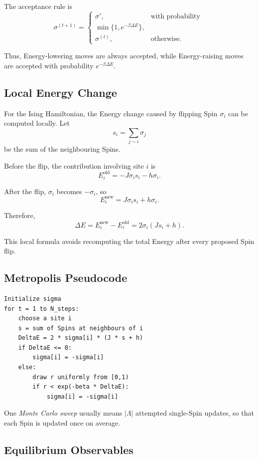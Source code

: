 \documentclass[a4paper, 10pt, onepage]{elegantbook}
\begin{document}
{The acceptance rule is
\[
\sigma^{(t+1)}
=
\begin{cases}
\sigma', & \text{with probability }  \\
\min\{1,e^{-\beta\Delta E}\}, \\
\sigma^{(t)}, & \text{otherwise}.
\end{cases}
\]

Thus, Energy-lowering moves are always accepted, while Energy-raising moves are
accepted with probability \(e^{-\beta\Delta E}\).

\subsection{Local Energy Change}

For the Ising Hamiltonian, the Energy change caused by flipping Spin
\(\sigma_i\) can be computed locally. Let
\[
s_i=\sum_{j\sim i}\sigma_j
\]
be the sum of the neighbouring Spins.

Before the flip, the contribution involving site \(i\) is
\[
E_i^{\mathrm{old}}
=
-J\sigma_i s_i-h\sigma_i.
\]

After the flip, \(\sigma_i\) becomes \(-\sigma_i\), so
\[
E_i^{\mathrm{new}}
=
J\sigma_i s_i+h\sigma_i.
\]

Therefore,
\[
\Delta E
=
E_i^{\mathrm{new}}-E_i^{\mathrm{old}}
=
2\sigma_i(Js_i+h).
\]

This local formula avoids recomputing the total Energy after every proposed
Spin flip.

\subsection{Metropolis Pseudocode}

\begin{verbatim}
Initialize sigma
for t = 1 to N_steps:
    choose a site i
    s = sum of Spins at neighbours of i
    DeltaE = 2 * sigma[i] * (J * s + h)
    if DeltaE <= 0:
        sigma[i] = -sigma[i]
    else:
        draw r uniformly from [0,1)
        if r < exp(-beta * DeltaE):
            sigma[i] = -sigma[i]
\end{verbatim}

One \emph{Monte Carlo sweep} usually means \(|\Lambda|\) attempted single-Spin
updates, so that each Spin is updated once on average.

\subsection{Equilibrium Observables}

}
\end{document}
